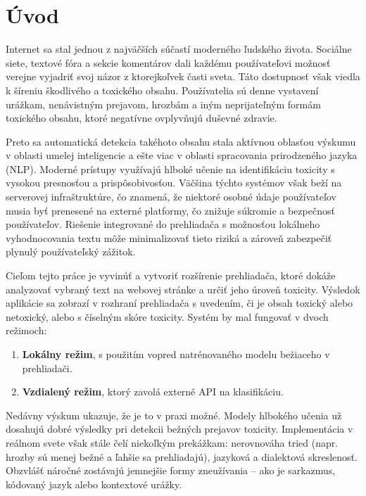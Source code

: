 
\chapter{Úvod}\label{ch:introduction}

Internet sa stal jednou z najväčších súčastí moderného ľudského života. Sociálne siete, textové fóra a sekcie komentárov dali každému používateľovi možnosť verejne vyjadriť svoj názor z ktorejkoľvek časti sveta. Táto dostupnosť však viedla k šíreniu škodlivého a toxického obsahu. Používatelia sú denne vystavení urážkam, nenávistným prejavom, hrozbám a iným neprijateľným formám toxického obsahu, ktoré negatívne ovplyvňujú duševné zdravie.

Preto sa automatická detekcia takéhoto obsahu stala aktívnou oblasťou výskumu v oblasti umelej inteligencie a ešte viac v oblasti spracovania prirodzeného jazyka (NLP). Moderné prístupy využívajú hlboké učenie na identifikáciu toxicity s vysokou presnosťou a prispôsobivosťou. Väčšina týchto systémov však beží na serverovej infraštruktúre, čo znamená, že niektoré osobné údaje používateľov musia byť prenesené na externé platformy, čo znižuje súkromie a bezpečnosť používateľov. Riešenie integrované do prehliadača s možnosťou lokálneho vyhodnocovania textu môže minimalizovať tieto riziká a zároveň zabezpečiť plynulý používateľský zážitok.

Cieľom tejto práce je vyvinúť a vytvoriť rozšírenie prehliadača, ktoré dokáže analyzovať vybraný text na webovej stránke a určiť jeho úroveň toxicity. Výsledok aplikácie sa zobrazí v rozhraní prehliadača s uvedením, či je obsah toxický alebo netoxický, alebo s číselným skóre toxicity. Systém by mal fungovať v dvoch režimoch:
\begin{enumerate}
  \item \textbf{Lokálny režim}, s použitím vopred natrénovaného modelu bežiaceho v prehliadači.
  \item \textbf{Vzdialený režim}, ktorý zavolá externé API na klasifikáciu.
\end{enumerate}

Nedávny výskum ukazuje, že je to v praxi možné. Modely hlbokého učenia už dosahujú dobré výsledky pri detekcii bežných prejavov toxicity. Implementácia v reálnom svete však stále čelí niekoľkým prekážkam: nerovnováha tried (napr. hrozby sú menej bežné a ľahšie sa prehliadajú), jazyková a dialektová skreslenosť. Obzvlášť náročné zostávajú jemnejšie formy zneužívania – ako je sarkazmus, kódovaný jazyk alebo kontextové urážky.


